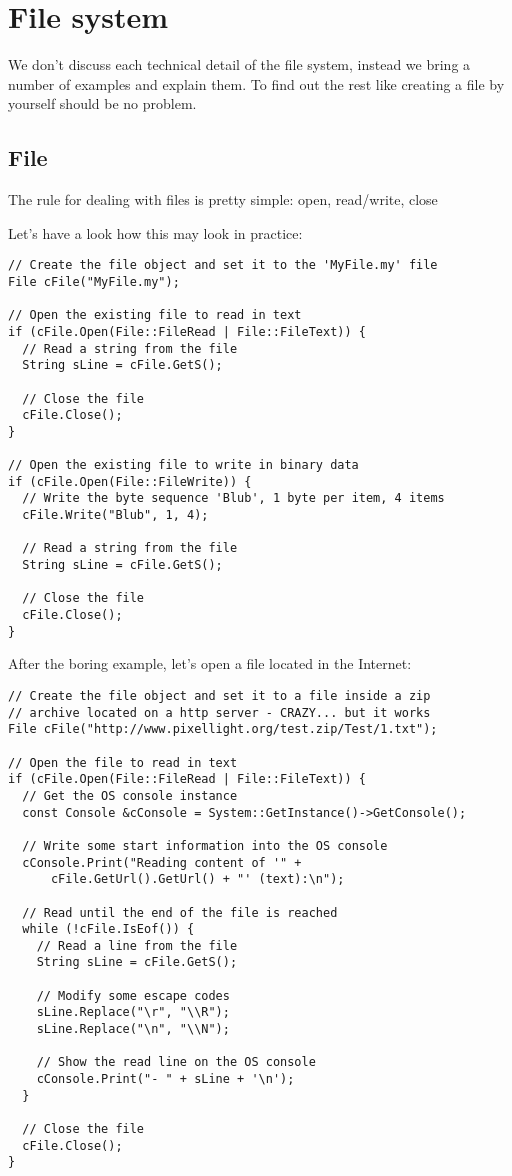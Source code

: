 \chapter{File system}
We don't discuss each technical detail of the file system, instead we bring a number of examples and explain them. To find out the rest like creating a file by yourself should be no problem.




\section{File}
The rule for dealing with files is pretty simple: open, read/write, close

Let's have a look how this may look in practice:

\begin{lstlisting}[caption=File usage example]
// Create the file object and set it to the 'MyFile.my' file
File cFile("MyFile.my");

// Open the existing file to read in text
if (cFile.Open(File::FileRead | File::FileText)) {
  // Read a string from the file
  String sLine = cFile.GetS();

  // Close the file
  cFile.Close();
}

// Open the existing file to write in binary data
if (cFile.Open(File::FileWrite)) {
  // Write the byte sequence 'Blub', 1 byte per item, 4 items
  cFile.Write("Blub", 1, 4);

  // Read a string from the file
  String sLine = cFile.GetS();

  // Close the file
  cFile.Close();
}
\end{lstlisting}

After the boring example, let's open a file located in the Internet:

\begin{lstlisting}[caption=http file usage example]
// Create the file object and set it to a file inside a zip
// archive located on a http server - CRAZY... but it works
File cFile("http://www.pixellight.org/test.zip/Test/1.txt");

// Open the file to read in text
if (cFile.Open(File::FileRead | File::FileText)) {
  // Get the OS console instance
  const Console &cConsole = System::GetInstance()->GetConsole();

  // Write some start information into the OS console
  cConsole.Print("Reading content of '" +
      cFile.GetUrl().GetUrl() + "' (text):\n");

  // Read until the end of the file is reached
  while (!cFile.IsEof()) {
    // Read a line from the file
    String sLine = cFile.GetS();

    // Modify some escape codes
    sLine.Replace("\r", "\\R");
    sLine.Replace("\n", "\\N");

    // Show the read line on the OS console
    cConsole.Print("- " + sLine + '\n');
  }

  // Close the file
  cFile.Close();
}
\end{lstlisting}




